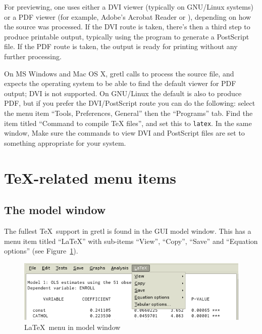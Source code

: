 For previewing, one uses either a DVI viewer (typically  on
GNU/Linux systems) or a PDF viewer (for example, Adobe's Acrobat
Reader or ), depending on how the source was processed.  If
the DVI route is taken, there's then a third step to produce printable
output, typically using the program  to generate a
PostScript file.  If the PDF route is taken, the output is ready for
printing without any further processing.

On MS Windows and Mac OS X, gretl calls  to
process the source file, and expects the operating system to be able
to find the default viewer for PDF output; DVI is not supported.  On
GNU/Linux the default is also to produce PDF, but if you prefer the
DVI/PostScript route you can do the following: select the menu item
``Tools, Preferences, General'' then the ``Programs'' tab.  Find the
item titled ``Command to compile TeX files'', and set this to
\texttt{latex}.  In the same window, Make sure the commands to view
DVI and PostScript files are set to something appropriate for your
system.

\section{\TeX-related menu items}
\label{tex-menus}

\subsection{The model window}

The fullest \TeX\ support in gretl is found in the GUI model
window.  This has a menu item titled ``LaTeX'' with sub-items
``View'', ``Copy'', ``Save'' and ``Equation options'' (see
Figure~\ref{fig:latex-menu}).  

\begin{figure}[htbp]
  \caption{\LaTeX\ menu in model window}
  \label{fig:latex-menu}
  \begin{center}
    \includegraphics[scale=0.75]{figures/latex_menu}
  \end{center}
\end{figure}

